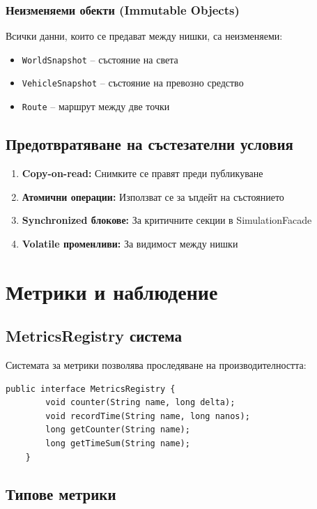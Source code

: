 \documentclass{article}
\begin{document}
\subsubsection{Неизменяеми обекти (Immutable Objects)}

Всички данни, които се предават между нишки, са неизменяеми:

\begin{itemize}
	\item \texttt{WorldSnapshot} – състояние на света
	\item \texttt{VehicleSnapshot} – състояние на превозно средство
	\item \texttt{Route} – маршрут между две точки
\end{itemize}

\subsection{Предотвратяване на състезателни условия}

\begin{enumerate}
	\item \textbf{Copy-on-read:} Снимките се правят преди публикуване
	\item \textbf{Атомични операции:} Използват се за ъпдейт на състоянието
	\item \textbf{Synchronized блокове:} За критичните секции в SimulationFacade
	\item \textbf{Volatile променливи:} За видимост между нишки
\end{enumerate}

\section{Метрики и наблюдение}

\subsection{MetricsRegistry система}

Системата за метрики позволява проследяване на производителността:

\begin{lstlisting}[caption=MetricsRegistry интерфейс]
	public interface MetricsRegistry {
		void counter(String name, long delta);
		void recordTime(String name, long nanos);
		long getCounter(String name);
		long getTimeSum(String name);
	}
\end{lstlisting}

\subsection{Типове метрики}
\end{document}
